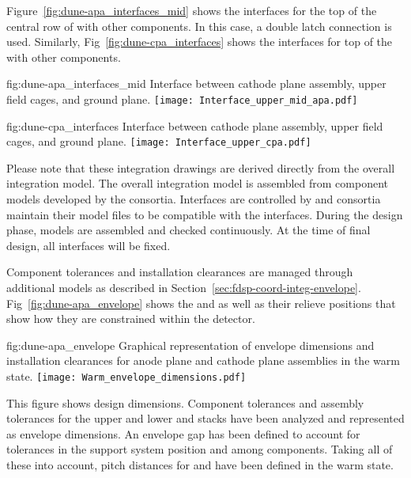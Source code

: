 Figure~\ref{fig:dune-apa_interfaces_mid} shows the interfaces for the
top of the central row of  with other components. In this case, a
double latch connection is used. Similarly,
Fig~\ref{fig:dune-cpa_interfaces} shows the interfaces for top of the
 with other components.
\begin{dunefigure}{fig:dune-apa_interfaces_mid}
  {Interface between cathode plane assembly, upper field cages, and ground plane.}
  \texttt{[image: Interface\_upper\_mid\_apa.pdf]}
\end{dunefigure}
\begin{dunefigure}{fig:dune-cpa_interfaces}
  {Interface between cathode plane assembly, upper field cages, and ground plane.}
  \texttt{[image: Interface\_upper\_cpa.pdf]}
\end{dunefigure}


Please note that these integration drawings are derived directly
from the overall integration model. The overall integration model is
assembled from component models developed by the
consortia. Interfaces are controlled by  and
consortia maintain their model files to be
compatible with the interfaces. During the design phase, models are
assembled and checked continuously. At the time of final design, all
interfaces will be fixed.


Component tolerances and installation clearances are managed through
additional models as described in Section~\ref{sec:fdsp-coord-integ-envelope}.
Fig~\ref{fig:dune-apa_envelope} shows the
 and  as well as their
relieve positions that show how they are constrained within the
detector.
\begin{dunefigure}{fig:dune-apa_envelope} {Graphical
    representation of envelope dimensions and installation clearances
    for anode plane and cathode plane assemblies in the warm state.}
  \texttt{[image: Warm\_envelope\_dimensions.pdf]}
\end{dunefigure}


This figure shows design dimensions. Component tolerances and
assembly tolerances for the upper and lower  and  stacks have
been analyzed and represented as envelope dimensions. An envelope
gap has been defined to account for tolerances in the support
system position and among components. Taking all of these into account,
pitch distances for  and  have been defined in the warm state.


